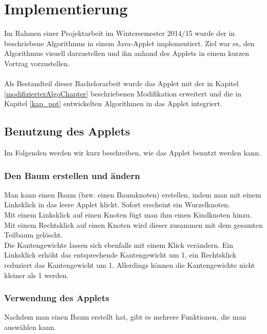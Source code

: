 \section{Implementierung}\label{kap_implementierung}

Im Rahmen einer Projektarbeit im Wintersemester 2014/15 wurde der in \cite{cima_paper} beschriebene Algorithmus in einem Java-Applet implementiert. Ziel war es, den Algorithmus visuell darzustellen und ihn anhand des Applets in einem kurzen Vortrag vorzustellen.
\\
\\
Als Bestandteil dieser Bachelorarbeit wurde das Applet mit der in Kapitel \ref{modifizierterAlgoChapter} beschriebenen Modifikation erweitert und die in Kapitel \ref{kap_pot} entwickelten Algorithmen in das Applet integriert.


\subsection*{Benutzung des Applets}

Im Folgenden werden wir kurz beschreiben, wie das Applet benutzt werden kann.

\subsubsection*{Den Baum erstellen und ändern}

Man kann einen Baum (bzw. einen Baumknoten) erstellen, indem man mit einem Linksklick in das leere Applet klickt. Sofort erscheint ein Wurzelknoten.\\
Mit einem Linksklick auf einen Knoten fügt man ihm einen Kindknoten hinzu. Mit einem Rechtsklick auf einen Knoten wird dieser zusammen mit dem gesamten Teilbaum gelöscht.\\
Die Kantengewichte lassen sich ebenfalls mit einem Klick verändern. Ein Linksklick erhöht das entsprechende Kantengewicht um 1, ein Rechtsklick reduziert das Kantengewicht um 1. Allerdings können die Kantengewichte nicht kleiner als 1 werden.


\subsubsection*{Verwendung des Applets}

Nachdem man einen Baum erstellt hat, gibt es mehrere Funktionen, die man auswählen kann.\\

